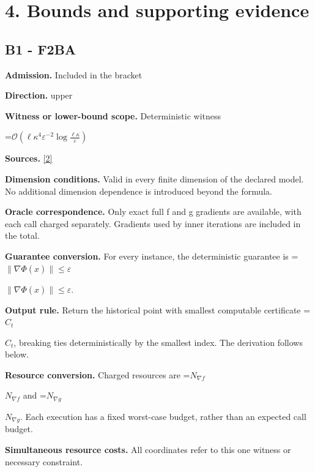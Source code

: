 \documentclass[10pt,a4paper]{article}
\newcommand{\AtlasMath}[1]{\par\begingroup\centering\setbox0=\hbox{$\displaystyle #1$}\ifdim\wd0>1.4\linewidth\typeout{ATLAS WIDE FORMULA: \the\wd0}\fi\ifdim\wd0>\linewidth\resizebox{\linewidth}{!}{\box0}\else\box0\fi\par\endgroup}
\newcommand{\AtlasInlineMath}[1]{\begingroup\setbox0=\hbox{$#1$}\ifdim\wd0>.4\linewidth\endgroup\AtlasMath{#1}\else\endgroup$#1$\fi}
\begin{document}
\section{4. Bounds and supporting evidence}


\subsection{B1 - F2BA}


\textbf{Admission.} Included in the bracket



\textbf{Direction.} upper



\textbf{Witness or lower-bound scope.} Deterministic witness



\AtlasMath{\mathcal{O}\!\left(\ell\kappa^4\varepsilon^{-2}\log\frac{\ell\kappa}{\varepsilon}\right)}


\textbf{Sources.} \href{https://jmlr.org/papers/volume26/23-1104/23-1104.pdf}{[2]}



\textbf{Dimension conditions.} Valid in every finite dimension of the declared model. No additional dimension dependence is introduced beyond the formula.



\textbf{Oracle correspondence.} Only exact full f and g gradients are available, with each call charged separately. Gradients used by inner iterations are included in the total.



\textbf{Guarantee conversion.} For every instance, the deterministic guarantee is \AtlasInlineMath{\|\nabla\Phi(\widehat x)\|\le\varepsilon}.



\textbf{Output rule.} Return the historical point with smallest computable certificate \AtlasInlineMath{C_t}, breaking ties deterministically by the smallest index. The derivation follows below.



\textbf{Resource conversion.} Charged resources are \AtlasInlineMath{N_{\nabla f}} and \AtlasInlineMath{N_{\nabla g}}. Each execution has a fixed worst-case budget, rather than an expected call budget.



\textbf{Simultaneous resource costs.} All coordinates refer to this one witness or necessary constraint.
\end{document}
